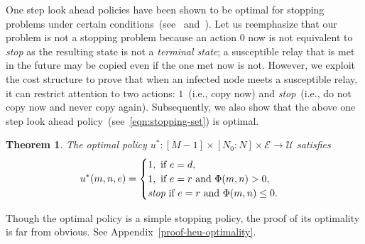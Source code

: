 \documentclass[10pt,journal,letterpaper]{IEEEtran}
\newtheorem{theorem}{Theorem}[section]
\begin{document}
One step look ahead policies have been shown to be optimal for
stopping problems under certain
conditions~(see~\cite[Section~4.4]{stochctrl.bertsekas05dpoc-vol1}
and~\cite[Section~3.4]{stochctrl.bertsekas07dpoc-vol2}).
Let us reemphasize that our problem is not a stopping problem because an action $0$ now
is not equivalent to {\it stop} as the resulting state
is not a {\it terminal state};  a susceptible relay that is met in
the future may be copied even if the one met now is not.
However, we exploit the cost structure to prove that when an infected node meets a susceptible relay,
it can restrict attention to two actions: $1$~(i.e., copy now) and \emph{stop}~(i.e., do not
copy now and never copy again).
Subsequently, we also show that the above one step look ahead policy~(see~\eqref{eqn:stopping-set}) is optimal.
\begin{theorem}
\label{heu-optimality} The optimal policy $u^{\ast}:[M-1] \times
[N_0:N] \times \mathcal{E} \rightarrow \mathcal{U}$ satisfies
\begin{align*}
u^{\ast}(m,n,e) = \begin{cases}
 1, \mbox{ if } e = d,\\
 1, \mbox{ if } e = r \mbox{ and } \Phi(m,n) > 0, \\
\mbox{{\it stop}} \mbox{ if } e = r \mbox{ and } \Phi(m,n) \leq 0.\end{cases}
\end{align*}
\end{theorem}
\begin{IEEEproof}
Though the optimal policy is a simple stopping policy, the proof of its optimality is far from obvious. 
See Appendix~\ref{proof-heu-optimality}.
\end{IEEEproof}
\end{document}
